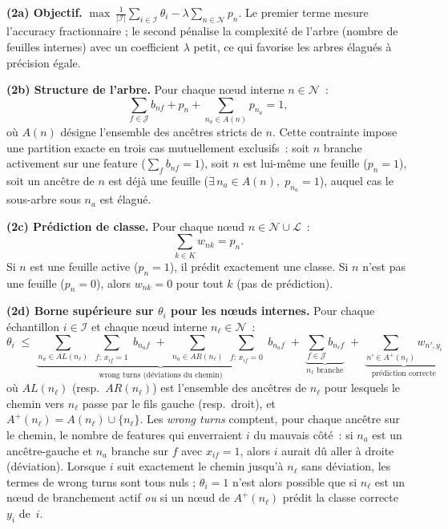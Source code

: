 \documentclass[a4paper,10pt,titlepage,leqno]{article}
\begin{document}
\begin{theorybox}

\textbf{(2a) Objectif.} $\displaystyle\max\ \frac{1}{|\mathcal{I}|}\sum_{i \in \mathcal{I}} \theta_i - \lambda \sum_{n \in \mathcal{N}} p_n$. Le premier terme mesure l'accuracy fractionnaire ; le second pénalise la complexité de l'arbre (nombre de feuilles internes) avec un coefficient $\lambda$ petit, ce qui favorise les arbres élagués à précision égale.

\medskip

\textbf{(2b) Structure de l'arbre.} Pour chaque nœud interne $n \in \mathcal{N}$~:
\[
  \sum_{f \in \mathcal{J}} b_{nf} + p_n + \sum_{n_a \in A(n)} p_{n_a} = 1,
\]
où $A(n)$ désigne l'ensemble des ancêtres stricts de $n$. Cette contrainte impose une partition exacte en trois cas mutuellement exclusifs~: soit $n$ branche activement sur une feature ($\sum_f b_{nf} = 1$), soit $n$ est lui-même une feuille ($p_n = 1$), soit un ancêtre de $n$ est déjà une feuille ($\exists\, n_a \in A(n),\; p_{n_a} = 1$), auquel cas le sous-arbre sous $n_a$ est élagué.

\medskip

\textbf{(2c) Prédiction de classe.} Pour chaque nœud $n \in \mathcal{N} \cup \mathcal{L}$~:
\[
  \sum_{k \in K} w_{nk} = p_n.
\]
Si $n$ est une feuille active ($p_n = 1$), il prédit exactement une classe. Si $n$ n'est pas une feuille ($p_n = 0$), alors $w_{nk} = 0$ pour tout $k$ (pas de prédiction).

\medskip

\textbf{(2d) Borne supérieure sur $\theta_i$ pour les nœuds internes.} Pour chaque échantillon $i \in \mathcal{I}$ et chaque nœud interne $n_\ell \in \mathcal{N}$~:
\[
  \theta_i \;\leq\; \underbrace{\sum_{n_a \in AL(n_\ell)} \sum_{\substack{f:\, x_{if}=1}} b_{n_a f} \;+\; \sum_{n_a \in AR(n_\ell)} \sum_{\substack{f:\, x_{if}=0}} b_{n_a f}}_{\text{wrong turns (déviations du chemin)}} \;+\; \underbrace{\sum_{f \in \mathcal{J}} b_{n_\ell f}}_{\text{$n_\ell$ branche}} \;+\; \underbrace{\sum_{n' \in A^+(n_\ell)} w_{n', y_i}}_{\text{prédiction correcte}}
\]
où $AL(n_\ell)$ (resp.\ $AR(n_\ell)$) est l'ensemble des ancêtres de $n_\ell$ pour lesquels le chemin vers $n_\ell$ passe par le fils gauche (resp.\ droit), et $A^+(n_\ell) = A(n_\ell) \cup \{n_\ell\}$. Les \emph{wrong turns} comptent, pour chaque ancêtre sur le chemin, le nombre de features qui enverraient $i$ du mauvais côté~: si $n_a$ est un ancêtre-gauche et $n_a$ branche sur $f$ avec $x_{if} = 1$, alors $i$ aurait dû aller à droite (déviation). Lorsque $i$ suit exactement le chemin jusqu'à $n_\ell$ sans déviation, les termes de wrong turns sont tous nuls ; $\theta_i = 1$ n'est alors possible que si $n_\ell$ est un nœud de branchement actif \emph{ou} si un nœud de $A^+(n_\ell)$ prédit la classe correcte $y_i$ de~$i$.


\end{theorybox}
\end{document}
